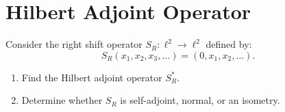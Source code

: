 \documentclass{article}
\begin{document}
\section{Hilbert Adjoint Operator}

\begin{problem}
    Consider the right shift operator $S_R: \ell^2 \to \ell^2$ defined by:
    \[ S_R(x_1, x_2, x_3, \ldots) = (0, x_1, x_2, \ldots). \]
    \begin{enumerate}
        \item[(a)] Find the Hilbert adjoint operator $S_R^*$.
        \item[(b)] Determine whether $S_R$ is self-adjoint, normal, or an isometry.
    \end{enumerate}
\end{problem}
\end{document}

